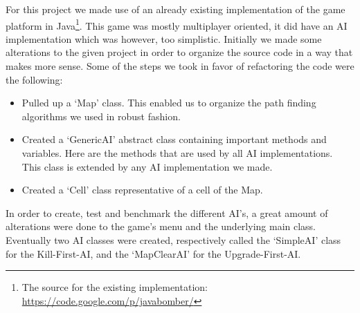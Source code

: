 For this project we made use of an already existing implementation of the game platform in Java\footnote{The source for the existing implementation: \url{https://code.google.com/p/javabomber/}}. This game was mostly multiplayer oriented, it did have an AI implementation which was however, too simplistic.
Initially we made some alterations to the given project in order to organize the source code in a way that makes more sense. Some of the steps we took in favor of refactoring the code were the following:
\begin{itemize}
\item Pulled up a `Map' class. This enabled us to organize the path finding algorithms we used in robust fashion.
\item Created a `GenericAI' abstract class containing important methods and variables. Here are the methods that are used by all AI implementations. This class is extended by any AI implementation we made.
\item Created a `Cell' class  representative of a cell of the Map.
\end{itemize}
In order to create, test and benchmark the different AI's, a great amount of alterations were done
to the game's menu and the underlying main class. Eventually two AI classes were
created, respectively called the `SimpleAI' class for the Kill-First-AI, and the
`MapClearAI' for the Upgrade-First-AI.


